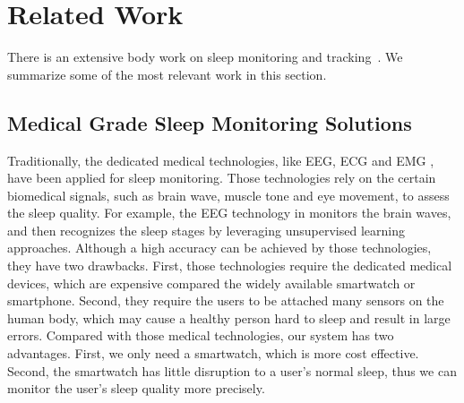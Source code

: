 \section{Related Work}\label{sec:5related}


There is an extensive body work on sleep monitoring and
tracking~\cite{langkvist2012sleep,hao2013isleep,bai2012will,kay2012lullaby,bain2003evaluation,pombo2016ubisleep}. We summarize some of the
most relevant work in this section.

\subsection{Medical Grade Sleep Monitoring Solutions}
Traditionally, the dedicated medical technologies, like EEG, ECG and EMG \cite{saper2005hypothalamic}, have been applied for sleep
monitoring. Those technologies rely on the certain biomedical signals, such as brain wave, muscle tone and eye movement, to assess the
sleep quality. For example, the EEG technology in \cite{langkvist2012sleep,oropesa1999sleep,ebrahimi2008automatic} monitors the brain
waves, and then recognizes the sleep stages by leveraging unsupervised learning approaches. Although a high accuracy can be achieved by
those technologies, they have two drawbacks. First, those technologies require the dedicated medical devices, which are expensive compared
the widely available smartwatch or smartphone. Second, they require the users to be attached many sensors on the human body, which may
cause a healthy person hard to sleep and result in large errors. Compared with those medical technologies, our system has two advantages.
First, we only need a smartwatch, which is more cost effective. Second, the smartwatch has little disruption to a user's normal sleep, thus
we can monitor the user's sleep quality more precisely.

